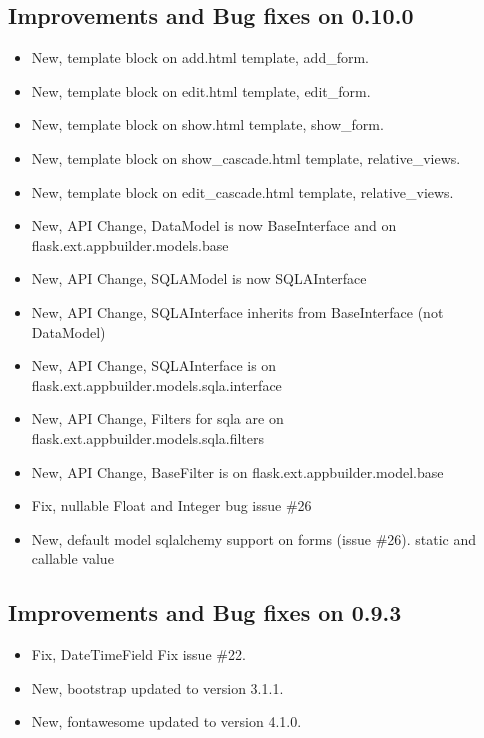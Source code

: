 \documentclass[letterpaper,10pt,english]{sphinxmanual}
\begin{document}
\subsection{Improvements and Bug fixes on 0.10.0}
\label{versions:improvements-and-bug-fixes-on-0-10-0}\begin{itemize}
\item {} 
New, template block on add.html template, add\_form.

\item {} 
New, template block on edit.html template, edit\_form.

\item {} 
New, template block on show.html template, show\_form.

\item {} 
New, template block on show\_cascade.html template, relative\_views.

\item {} 
New, template block on edit\_cascade.html template, relative\_views.

\item {} 
New, API Change, DataModel is now BaseInterface and on flask.ext.appbuilder.models.base

\item {} 
New, API Change, SQLAModel is now SQLAInterface

\item {} 
New, API Change, SQLAInterface inherits from BaseInterface (not DataModel)

\item {} 
New, API Change, SQLAInterface is on flask.ext.appbuilder.models.sqla.interface

\item {} 
New, API Change, Filters for sqla are on flask.ext.appbuilder.models.sqla.filters

\item {} 
New, API Change, BaseFilter is on flask.ext.appbuilder.model.base

\item {} 
Fix, nullable Float and Integer bug issue \#26

\item {} 
New, default model sqlalchemy support on forms (issue \#26). static and callable value

\end{itemize}


\subsection{Improvements and Bug fixes on 0.9.3}
\label{versions:improvements-and-bug-fixes-on-0-9-3}\begin{itemize}
\item {} 
Fix, DateTimeField Fix issue \#22.

\item {} 
New, bootstrap updated to version 3.1.1.

\item {} 
New, fontawesome updated to version 4.1.0.

\end{itemize}
\end{document}
